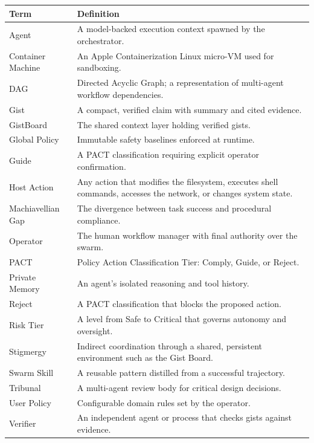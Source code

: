 \documentclass[12pt,letterpaper]{article}
\begin{document}
\begin{longtable}{|p{4cm}|p{10cm}|}
\hline
\textbf{Term} & \textbf{Definition} \\
\hline
\endhead
Agent & A model-backed execution context spawned by the orchestrator. \\
\hline
Container Machine & An Apple Containerization Linux micro-VM used for sandboxing. \\
\hline
DAG & Directed Acyclic Graph; a representation of multi-agent workflow dependencies. \\
\hline
Gist & A compact, verified claim with summary and cited evidence. \\
\hline
GistBoard & The shared context layer holding verified gists. \\
\hline
Global Policy & Immutable safety baselines enforced at runtime. \\
\hline
Guide & A PACT classification requiring explicit operator confirmation. \\
\hline
Host Action & Any action that modifies the filesystem, executes shell commands, accesses the network, or changes system state. \\
\hline
Machiavellian Gap & The divergence between task success and procedural compliance. \\
\hline
Operator & The human workflow manager with final authority over the swarm. \\
\hline
PACT & Policy Action Classification Tier: Comply, Guide, or Reject. \\
\hline
Private Memory & An agent's isolated reasoning and tool history. \\
\hline
Reject & A PACT classification that blocks the proposed action. \\
\hline
Risk Tier & A level from Safe to Critical that governs autonomy and oversight. \\
\hline
Stigmergy & Indirect coordination through a shared, persistent environment such as the Gist Board. \\
\hline
Swarm Skill & A reusable pattern distilled from a successful trajectory. \\
\hline
Tribunal & A multi-agent review body for critical design decisions. \\
\hline
User Policy & Configurable domain rules set by the operator. \\
\hline
Verifier & An independent agent or process that checks gists against evidence. \\
\hline
\end{longtable}
\end{document}
